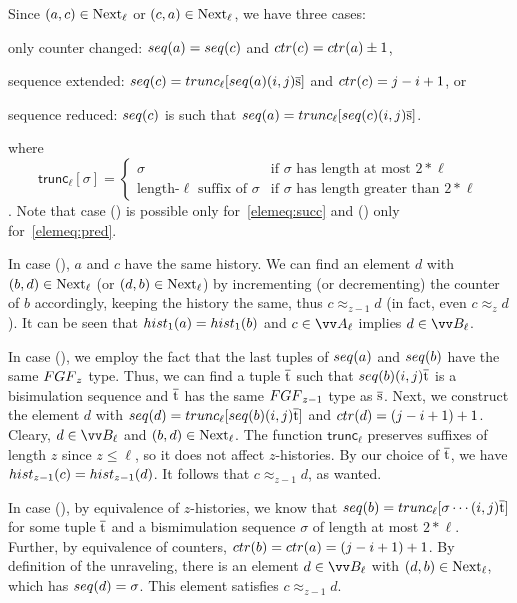 \begin{proofsketch}
  Since $(a,c) \in \mathrm{Next}_{\ell}$ or $(c,a) \in \mathrm{Next}_{\ell}$, we have three cases:
  \begin{romanenumerate}
    \item only counter changed: $\seq{a} = \seq{c}$ and $\ctr{c} = \ctr{a} \pm 1$,
    \item sequence extended: $\seq{c} = \mathsf{trunc}_{\ell}[\seq{a} (i,j) \elemtuples]$ and $\ctr{c} = j-i+1$, or
    \item sequence reduced: $\seq{c}$ is such that $\seq{a} = \mathsf{trunc}_{\ell}[\seq{c} (i,j) \elemtuples]$.
  \end{romanenumerate}
  where
  \begin{displaymath}
    \mathsf{trunc}_{\ell}[\sigma] =
    \begin{cases}
      \sigma & \text{if $\sigma$ has length at most $2 * \ell$} \\
      \text{length-$\ell$ suffix of $\sigma$} & \text{if $\sigma$ has length greater than $2 * \ell$}
    \end{cases}
  \end{displaymath}.
  Note that case () is possible only for~\ref{elemeq:succ} and () only for~\ref{elemeq:pred}.

  In case (), $a$ and $c$ have the same history.
  We can find an element $d$ with $(b,d) \in \mathrm{Next}_{\ell}$ (or $(d,b) \in \mathrm{Next}_{\ell}$) by incrementing (or decrementing) the counter of $b$ accordingly, keeping the history the same, thus $c \approx_{z-1} d$ (in fact, even $c \approx_{z} d$).
  It can be seen that $\hist{1}{a} = \hist{1}{b}$ and $c \in \unraveldom{A}_{\ell}$ implies $d \in \unraveldom{B}_{\ell}$.

  In case (), we employ the fact that the last tuples of $\seq{a}$ and $\seq{b}$ have the same $\FGF_{z}$ type.
  Thus, we can find a tuple $\overline{\mathrm{t}}$ such that $\seq{b} (i,j) \elemtuplet$ is a bisimulation sequence and $\overline{\mathrm{t}}$ has the same $\FGF_{z-1}$ type as $\overline{\mathrm{s}}$.
  Next, we construct the element $d$ with $\seq{d} = \mathsf{trunc}_{\ell}[\seq{b}(i,j)\elemtuplet]$ and $\ctr{d} = (j-i+1) + 1$.
  Cleary, $d \in \unraveldom{B}_{\ell}$ and $(b,d) \in \mathrm{Next}_{\ell}$.
  The function $\mathsf{trunc}_{\ell}$ preserves suffixes of length $z$ since $z \le \ell$, so it does not affect $z$-histories.
  By our choice of $\overline{\mathrm{t}}$, we have $\hist{z-1}{c} = \hist{z-1}{d}$.
  It follows that $c \approx_{z-1} d$, as wanted.

  In case (), by equivalence of $z$-histories, we know that $\seq{b} = \mathsf{trunc}_{\ell}[\sigma \cdots(i,j)\elemtuplet]$ for some tuple $\overline{\mathrm{t}}$ and a bismimulation sequence $\sigma$ of length at most $2 * \ell$.
  Further, by equivalence of counters, $\ctr{b} = \ctr{a} = (j-i+1) + 1$.
  By definition of the unraveling, there is an element $d \in \unraveldom{B}_{\ell}$ with $(d,b) \in \mathrm{Next}_{\ell}$, which has $\seq{d} = \sigma$.
  This element satisfies $c \approx_{z-1} d$.
\end{proofsketch}
